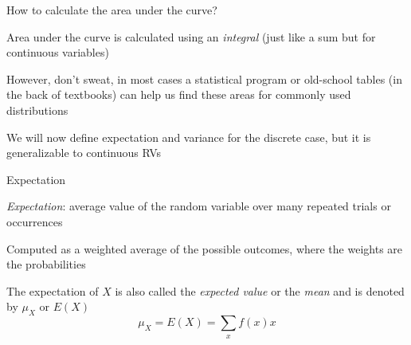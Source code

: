 \documentclass{./../div_teaching_slides}
\begin{document}
\begin{frame}{How to calculate the area under the curve?}
\begin{witemize}
  \item Area under the curve is calculated using an \textit{integral} (just like a sum but for continuous variables)
  \item However, don't sweat, in most cases a statistical program or old-school tables (in the back of textbooks) can help us find these areas for commonly used distributions
  \item We will now define expectation and variance for the discrete case, but it is generalizable to continuous RVs
\end{witemize}
\end{frame}


\begin{frame}{Expectation}
\begin{witemize}
  \item \textit{Expectation}: average value of the random variable over many repeated trials or occurrences
  \item Computed as a weighted average of the possible outcomes, where the weights are the probabilities
  \item The expectation of $X$ is also called the \textit{expected value} or the \textit{mean} and is denoted by $\mu_X$ or $E(X)$
  $$ \mu_X = E(X) = \sum_x f(x) x $$
  \end{witemize}
\end{frame}

\end{document}
